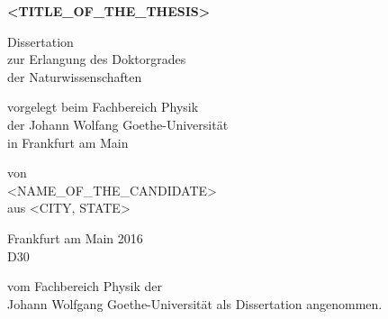 \documentclass{cd-cover}
\begin{document}
    \CDbookletTopMargin=0mm
    \CDbookletMargin=5mm
    \begin{bookletsheets}
        \vspace*{3mm}

        \begin{center} \sffamily\Large\bfseries
            <TITLE_OF_THE_THESIS>
        \end{center}

        \vspace*{3mm}

        \begin{center} \sffamily\small
            Dissertation\\
            zur Erlangung des Doktorgrades\\
            der Naturwissenschaften
        \end{center}

        \vspace*{2mm}

        \begin{center} \sffamily\small
            vorgelegt beim Fachbereich Physik\\
            der Johann Wolfang Goethe-Universit\"at\\
            in Frankfurt am Main
        \end{center}

        \vspace*{2mm}

        \begin{center} \sffamily\small
            von\\
            <NAME_OF_THE_CANDIDATE>\\
            aus <CITY, STATE>
        \end{center}

        \vspace*{2mm}

        \begin{center} \sffamily\small
        Frankfurt am Main 2016\\
        D30
        \end{center}

        \vspace*{0.25\textheight}

        \noindent{}%
        vom Fachbereich Physik der \\[2pt]
        Johann Wolfgang Goethe-Universit\"at als Dissertation angenommen.

        \vspace*{2cm}


\end{bookletsheets}
\end{document}
